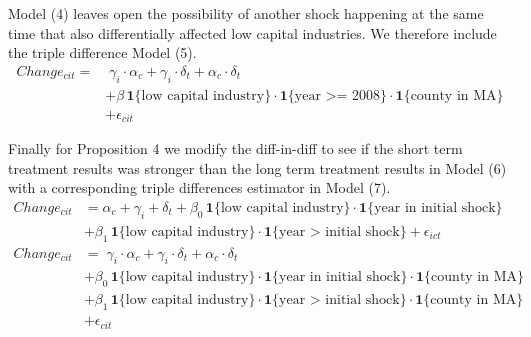 \documentclass[12pt]{article}
\begin{document}
Model (4) leaves open the possibility of another shock happening at the same time that also differentially affected low capital industries. We therefore include the triple difference Model (5). 
\begin{align}
Change_{cit} = & \; \gamma_i \cdot \alpha_c + \gamma_i \cdot \delta_t +  \alpha_c \cdot \delta_t \nonumber   \\
& + \beta \, \mathbf{1}\{\text{low capital industry}\} \cdot \mathbf{1}\{\text{year >= 2008}\}  \cdot \mathbf{1}\{\text{county in MA}\} \nonumber  \\
& + \epsilon_{cit}
\end{align}

Finally for Proposition 4 we modify the diff-in-diff to see if the short term treatment results was stronger than the long term treatment results in Model (6) with a corresponding triple differences estimator in Model (7). 
\begin{align}
Change_{cit} & =  \alpha_c + \gamma_i+ \delta_t  \nonumber + \beta_{0} \, \mathbf{1}\{\text{low capital industry}\} \cdot \mathbf{1}\{\text{year in initial shock}\} \nonumber \\
& + \beta_{1} \, \mathbf{1}\{\text{low capital industry}\} \cdot \mathbf{1}\{\text{year > initial shock}\} + \epsilon_{ict} \\
Change_{cit} & =  \; \gamma_i \cdot \alpha_c + \gamma_i \cdot \delta_t +  \alpha_c \cdot \delta_t \nonumber   \\
& + \beta_{0} \, \mathbf{1}\{\text{low capital industry}\} \cdot \mathbf{1}\{\text{year in initial shock}\}  \cdot \mathbf{1}\{\text{county in MA}\} \nonumber  \\
& + \beta_{1} \, \mathbf{1}\{\text{low capital industry}\} \cdot \mathbf{1}\{\text{year > initial shock}\}  \cdot \mathbf{1}\{\text{county in MA}\} \nonumber  \\
& + \epsilon_{cit}
\end{align}
\end{document}
